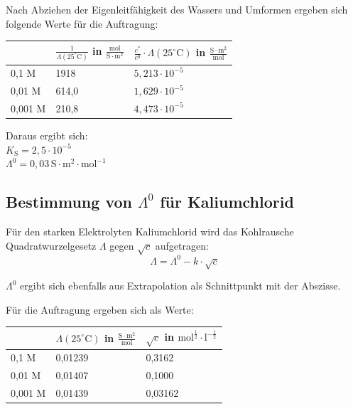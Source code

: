 \documentclass[12pt,a4paper,titlepage,headinclude,bibtotoc]{scrartcl}
\begin{document}
Nach Abziehen der Eigenleitfähigkeit des Wassers und Umformen ergeben sich folgende Werte für die Auftragung:\\

\begin{table} [h]
\centering 
\begin{tabular}{|p{4cm}||p{4cm}|p{4cm}|}
\hline
& $\frac{1}{\Lambda(25^\circ\text{C})}$ in $\frac{\mathrm{mol}}{\mathrm{S} \cdot \mathrm{m^2}}$ & $\frac{c^*}{c^0} \cdot \Lambda(25^\circ\text{C})$ in $\frac{\mathrm{S} \cdot \mathrm{m^2}}{\mathrm{mol}}$\\
\hline
0,1 M & 1918 & $5,213 \cdot 10^{-5}$  \\
\hline
0,01 M & 614,0 & $1,629 \cdot 10^{-5}$  \\
\hline
0,001 M & 210,8 & $4,473 \cdot 10^{-5}$ \\
\hline
\end{tabular}
\end{table}

Daraus ergibt sich:\\

$K_{\mathrm{S}} = 2,5 \cdot 10^{-5}$\\
$\Lambda^0 = 0,03\, \mathrm{S} \cdot \mathrm{m^2} \cdot \mathrm{mol^{-1}}$\\





\subsection{Bestimmung von $\Lambda^0$ für Kaliumchlorid}

Für den starken Elektrolyten Kaliumchlorid wird das Kohlrausche Quadratwurzelgesetz $\Lambda$ gegen $\sqrt{c}$ aufgetragen:\\

\begin{equation}
\Lambda = \Lambda^0 - k \cdot \sqrt{c}
\end{equation}

$\Lambda^0$ ergibt sich ebenfalls aus Extrapolation als Schnittpunkt mit der Abszisse.

Für die Auftragung ergeben sich als Werte:\\


\begin{table} [h]
\centering 
\begin{tabular}{|p{4cm}||p{4cm}|p{4cm}|}
\hline
& $\Lambda(25^\circ\text{C})$ in $\frac{\mathrm{S} \cdot \mathrm{m^2}}{\mathrm{mol}}$ & $\sqrt{c}$ in $\mathrm{mol^{\frac{1}{2}}} \cdot \mathrm{l^{- \frac{1}{2}}}$\\
\hline
0,1 M & 0,01239 & 0,3162 \\
\hline
0,01 M & 0,01407 & 0,1000 \\
\hline
0,001 M & 0,01439 & 0,03162 \\
\hline
\end{tabular}
\end{table}
\end{document}
